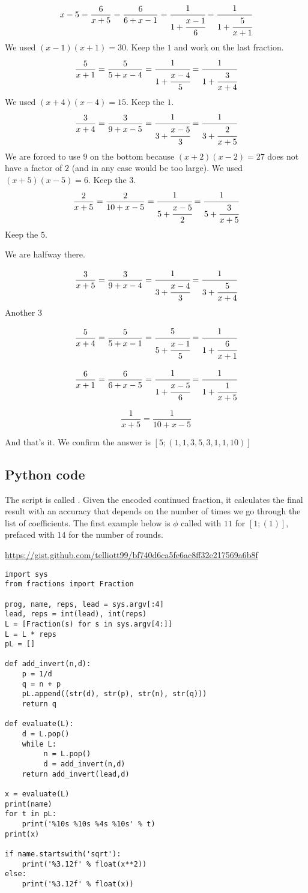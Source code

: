 \documentclass[11pt, oneside]{article}
\begin{document}
\[ x - 5 =  \frac{6}{x + 5} = \frac{6}{6 + x - 1} =  \cfrac{1}{1 + \cfrac{x - 1}{6}} =  \cfrac{1}{1 + \cfrac{5}{x + 1}}  \]
We used $(x-1)(x+1) = 30$.  Keep the $1$ and work on the last fraction.
\[ \frac{5}{x + 1} = \frac{5}{5 + x - 4} =  \cfrac{1}{1 + \cfrac{x - 4}{5}} =  \cfrac{1}{1 + \cfrac{3}{x + 4}}  \]
We used $(x + 4)(x - 4) = 15$.  Keep the $1$.
\[ \frac{3}{x + 4} = \frac{3}{9 + x - 5} =  \cfrac{1}{3 + \cfrac{x - 5}{3}} =  \cfrac{1}{3 + \cfrac{2}{x + 5}}  \]
We are forced to use $9$ on the bottom because $(x + 2)(x - 2) = 27$ does not have a factor of $2$ (and in any case would be too large).  We used $(x + 5)(x - 5) = 6$.  Keep the $3$.
\[ \frac{2}{x + 5} = \frac{2}{10 + x - 5} =  \cfrac{1}{5 + \cfrac{x - 5}{2}} =  \cfrac{1}{5 + \cfrac{3}{x + 5}}  \]
Keep the $5$.

We are halfway there.

\[ \frac{3}{x + 5} = \frac{3}{9 + x - 4} =  \cfrac{1}{3 + \cfrac{x - 4}{3}} =  \cfrac{1}{3 + \cfrac{5}{x + 4}}  \]
Another $3$

\[ \frac{5}{x + 4} = \frac{5}{5 + x - 1} =  \cfrac{5}{5 + \cfrac{x - 1}{5}} =  \cfrac{1}{1 + \cfrac{6}{x + 1}}  \]

\[ \frac{6}{x + 1} = \frac{6}{6 + x - 5} =  \cfrac{1}{1 + \cfrac{x - 5}{6}} =  \cfrac{1}{1 + \cfrac{1}{x + 5}}  \]

\[ \frac{1}{x + 5} = \frac{1}{10 + x - 5}   \]

And that's it.  We confirm the answer is $[5;(1,1,3,5,3,1,1,10)]$

\newpage

\subsection*{Python code}

The script is called .  Given the encoded continued fraction, it calculates the final result with an accuracy that depends on the number of times we go through the list of coefficients.  The first example below is $\phi$ called with $1 1$ for $[1;(1)]$, prefaced with $14$ for the number of rounds.

\url{https://gist.github.com/telliott99/bf740d6ca5fe6ac8ff32e217569a6b8f}

\begin{verbatim}
import sys
from fractions import Fraction

prog, name, reps, lead = sys.argv[:4]
lead, reps = int(lead), int(reps)
L = [Fraction(s) for s in sys.argv[4:]] 
L = L * reps
pL = []

def add_invert(n,d):
    p = 1/d
    q = n + p
    pL.append((str(d), str(p), str(n), str(q)))
    return q

def evaluate(L):
    d = L.pop()
    while L:
         n = L.pop()
         d = add_invert(n,d)
    return add_invert(lead,d)

x = evaluate(L)
print(name)
for t in pL:
    print('%10s %10s %4s %10s' % t)
print(x)
   
if name.startswith('sqrt'):
    print('%3.12f' % float(x**2))
else:
    print('%3.12f' % float(x))

\end{verbatim}
\end{document}
